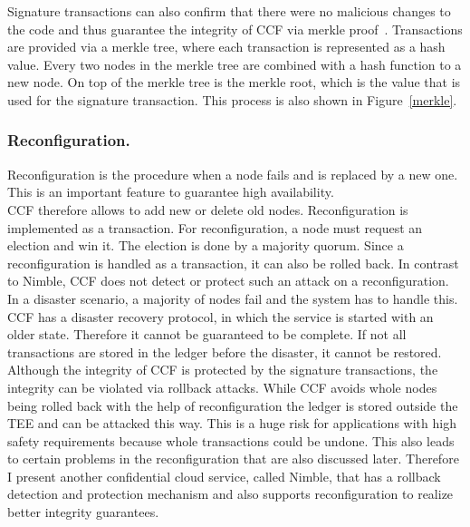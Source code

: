   Signature transactions can also confirm that there were no malicious changes to the code and thus guarantee the integrity of CCF via merkle proof~\cite{merkle}. Transactions are provided via a merkle tree, where each transaction is represented as a hash value. Every two nodes in the merkle tree are combined with a hash function to a new node. On top of the merkle tree is the merkle root, which is the value that is used for the signature transaction. This process is also shown in Figure~\ref{merkle}.\\
  
   
  \subsubsection*{Reconfiguration.}
  Reconfiguration is the procedure when a node fails and is replaced by a new one. This is an important feature to guarantee high availability.\\
CCF therefore allows to add new or delete old nodes. Reconfiguration is implemented as a transaction. For reconfiguration, a node must request an election and win it. The election is done by a majority quorum. Since a reconfiguration is handled as a transaction, it can also be rolled back. In contrast to Nimble, CCF does not detect or protect such an attack on a reconfiguration.\\%
In a disaster scenario, a majority of nodes fail and the system has to handle this. CCF has a disaster recovery protocol, in which the service is started with an older state. Therefore it cannot be guaranteed to be complete. If not all transactions are stored in the ledger before the disaster, it cannot be restored. \\
  Although the integrity of CCF is protected by the signature transactions, the integrity can be violated via rollback attacks. While CCF avoids whole nodes being rolled back with the help of reconfiguration the ledger is stored outside the TEE and can be attacked this way. This is a huge risk for applications with high safety requirements because whole transactions could be undone. This also leads to certain problems in the reconfiguration that are also discussed later. Therefore I present another confidential cloud service, called Nimble, that has a rollback detection and protection mechanism and also supports reconfiguration to realize better integrity guarantees.
 

